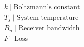 \documentclass[preview]{standalone}
\begin{document}
\begin{align*}
&k\  \text{| Boltzmann's constant} \\ &T_s\  \text{| System temperature} \\ &B_n\  \text{| Receiver bandwidth} \\ &F\  \text{| Loss}
\end{align*}
\end{document}

